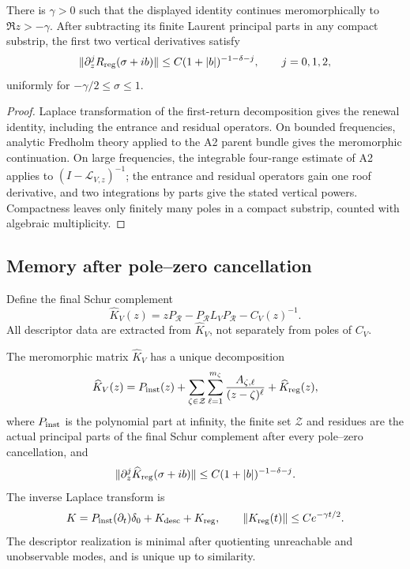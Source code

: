 \begin{theorem}
\label{thm:r14-a4-resolvent}
There is \(\gamma>0\) such that the displayed identity continues
meromorphically to \(\Re z>-\gamma\).  After subtracting its finite Laurent
principal parts in any compact substrip, the first two vertical derivatives
satisfy
\[
 \|\partial_z^jR_{\rm reg}(\sigma+ib)\|
 \le C(1+|b|)^{-1-\delta-j},
 \qquad j=0,1,2,
\]
uniformly for \(-\gamma/2\le\sigma\le1\).
\end{theorem}

\begin{proof}
Laplace transformation of the first-return decomposition gives the renewal
identity, including the entrance and residual operators.  On bounded
frequencies, analytic Fredholm theory applied to the A2 parent bundle gives
the meromorphic continuation.  On large frequencies, the integrable
four-range estimate of A2 applies to \((I-\mathcal L_{V,z})^{-1}\); the
entrance and residual operators gain one roof derivative, and two
integrations by parts give the stated vertical powers.  Compactness leaves
only finitely many poles in a compact substrip, counted with algebraic
multiplicity.
\end{proof}

\subsection{Memory after pole--zero cancellation}

Define the final Schur complement
\[
 \widehat K_V(z)
 =zP_{\mathcal R}-P_{\mathcal R}L_VP_{\mathcal R}-C_V(z)^{-1}.
\]
All descriptor data are extracted from \(\widehat K_V\), not separately from
poles of \(C_V\).

\begin{theorem}
\label{thm:r14-a4-memory}
The meromorphic matrix \(\widehat K_V\) has a unique decomposition
\[
 \widehat K_V(z)
 =P_{\rm inst}(z)
  +\sum_{\zeta\in\mathcal Z}
   \sum_{\ell=1}^{m_\zeta}
   {A_{\zeta,\ell}\over(z-\zeta)^\ell}
  +\widehat K_{\rm reg}(z),
\]
where \(P_{\rm inst}\) is the polynomial part at infinity, the finite set
\(\mathcal Z\) and residues are the actual principal parts of the final Schur
complement after every pole--zero cancellation, and
\[
 \|\partial_z^j\widehat K_{\rm reg}(\sigma+ib)\|
 \le C(1+|b|)^{-1-\delta-j}.
\]
The inverse Laplace transform is
\[
 K=P_{\rm inst}(\partial_t)\delta_0
   +K_{\rm desc}+K_{\rm reg},
 \qquad
 \|K_{\rm reg}(t)\|\le Ce^{-\gamma t/2}.
\]
The descriptor realization is minimal after quotienting unreachable and
unobservable modes, and is unique up to similarity.
\end{theorem}

